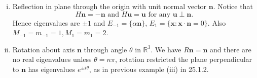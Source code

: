 \documentclass[a4paper]{article}
\begin{document}
\begin{example}
\begin{enumerate}[(i)]
\[\begin{pmatrix}
                -1\\1\\0
              \end{pmatrix}+\beta
              \begin{pmatrix}
                1\\0\\1
            \end{pmatrix} \right\}
          .\]
          Hence $ \dim E_{-2}=m_{-2}=2<M_{-2} $.
        \item Reflection in plane through the origin with unit normal
          vector $ \mathbf{n} $. Notice that
          \[
            H\mathbf{n}=-\mathbf{n} \text{ and }
            H\mathbf{u}=\mathbf{u} \text{ for any }\mathbf{u} \perp \mathbf{n}
          .\]
          Hence eigenvalues are $ \pm 1 $ and $
          E_{-1}=\{\alpha\mathbf{n}\} $, $
          E_1=\{\mathbf{x}:\mathbf{x}\cdot \mathbf{n}=0\} $. Also $
          M_{-1}=m_{-1}=1, M_1=m_1=2 $.
        \item Rotation about axis $ \mathbf{n} $ through angle $
          \theta $ in $ \mathbb{R}^{3} $. We have $
          R\mathbf{n}=\mathbf{n} $ and there are no real eigenvalues
          unless $ \theta=n\pi $, rotation restricted the plane
          perpendicular to $\mathbf{n}$ has eigenvalues $ e^{\pm
          i\theta} $, as in previous example (iii) in 25.1.2.
      \end{enumerate}
    \end{example}
\end{document}
